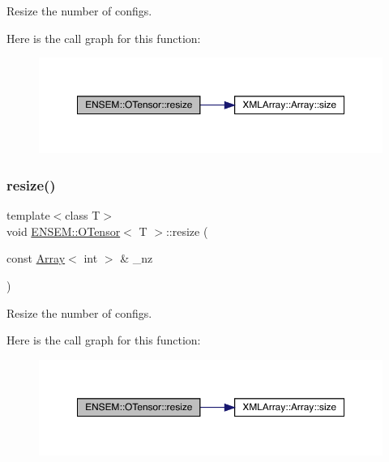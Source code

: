 Resize the number of configs. 

Here is the call graph for this function\+:
\nopagebreak
\begin{figure}[H]
\begin{center}
\leavevmode
\includegraphics[width=350pt]{da/d8a/classENSEM_1_1OTensor_abe0bd734d08b1140d7794ec760a89435_cgraph}
\end{center}
\end{figure}
\mbox{\label{classENSEM_1_1OTensor_abe0bd734d08b1140d7794ec760a89435}} 
\subsubsection{\texorpdfstring{resize()}{resize()}\hspace{0.1cm}{\footnotesize\ttfamily [3/6]}}
{\footnotesize\ttfamily template$<$class T$>$ \\
void \mbox{\hyperlink{classENSEM_1_1OTensor}{E\+N\+S\+E\+M\+::\+O\+Tensor}}$<$ T $>$\+::resize (\begin{DoxyParamCaption}\item[{const \mbox{\hyperlink{classXMLArray_1_1Array}{Array}}$<$ int $>$ \&}]{\+\_\+nz }\end{DoxyParamCaption})\hspace{0.3cm}{\ttfamily [inline]}}



Resize the number of configs. 

Here is the call graph for this function\+:
\nopagebreak
\begin{figure}[H]
\begin{center}
\leavevmode
\includegraphics[width=350pt]{da/d8a/classENSEM_1_1OTensor_abe0bd734d08b1140d7794ec760a89435_cgraph}
\end{center}
\end{figure}
\mbox{\label{classENSEM_1_1OTensor_aee9b85f3726c01139b9194a3b95809d3}} 
